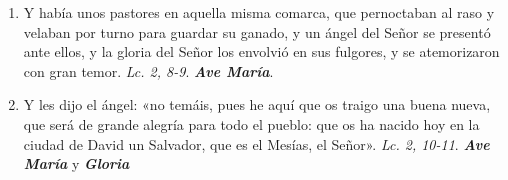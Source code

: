 \documentclass[../../devocionario.tex]{subfiles}
\begin{document}
\begin{enumerate}
        \item Y había unos pastores en aquella misma comarca, que pernoctaban al raso y velaban por turno para guardar su ganado, 
            y un ángel del Señor se presentó ante ellos, y la gloria del Señor los envolvió en sus fulgores, 
            y se atemorizaron con gran temor. \textit{Lc. 2, 8-9}. \textbf{\textit{Ave María}}.

        \item Y les dijo el ángel: «no temáis, pues he aquí que os traigo una buena nueva, que será de grande alegría para todo el pueblo: 
            que os ha nacido hoy en la ciudad de David un Salvador, 
            que es el Mesías, el Señor». \textit{Lc. 2, 10-11}. \textbf{\textit{Ave María}} y \textbf{\textit{Gloria}}
    
    \end{enumerate}
\end{document}
